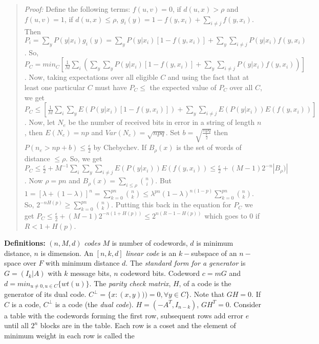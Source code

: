 \begin{quote}
\emph{Proof:}
Define the following terms: $f(u, v) = 0$, if $d(u,x) > \rho$ and
$f(u, v) = 1$, if $d(u,x) \leq \rho$,
$g_{i}(y)= 1- f(y, x_{i} ) + \sum_{i \ne j} f(y, x_{i})$. Then
$P_{i}= \sum_{y} P(y | x_{i}) g_{i}(y) =
\sum_{y} P(y|x_i ) [1- f(y, x_{i} )] + \sum_{y} \sum_{i \ne j}
P(y | x_i ) f(y, x_{i})$. So,
$P_{C}= min_{C} [{\frac {1} {M}}  \sum_{i} (\sum_{y}
\sum_{y} P(y|x_i ) [1- f(y, x_{i} )] + \sum_{y} \sum_{i \ne j}
P(y | x_i ) f(y, x_{i}))]$. Now,
taking expectations over all eligible $C$
and using the fact that at least one particular $C$ must have $P_C \leq$
the expected value of $P_C$  over all $C$, we get
$P_{C} \leq  [{\frac {1} {M}} \sum_{i}
\sum_{y} E(P(y|x_i ) [1- f(y, x_{i})]) + \sum_{y} \sum_{i \ne j}
E(P(y | x_i )) E(f(y, x_{i}))]$. Now,
let $N_e$ be the number of received bits in error in
a string of length $n$,
then $E(N_{e})= np$ and $Var(N_{e})= {\sqrt {npq}}$.  Set
$b= {\sqrt {\frac {npq} {\frac \epsilon 2}}}$ then
$P(n_e > np + b ) \leq {\frac \epsilon 2}$ by Chebychev. If $B_{\rho}(x)$
is the set of words of distance $\leq \rho$.  So, we get
$ P_C \leq {\frac {\epsilon} 2} + M^{-1} \sum_i \sum_y \sum_{i \ne j}
E(P(y | x_i )) E(f(y, x_i )) \leq {\frac {\epsilon} {2}} +
(M-1) 2^{-n} {|B_{\rho})|}$.
Now $\rho = pn$ and $B_{\rho}(x)= \sum_{i \leq \rho} { n \choose i}$.  But
$1= [\lambda +( 1- \lambda )]^{n}= \sum_{k=0}^{pn} {n \choose k} \leq
\lambda^{pn} (1-\lambda)^{n(1-p)} \sum_{k=0}^{pn} {n \choose k}$.  So,
$2^{-nH(p)} \geq \sum_{k=0}^{pn} {n \choose k}$.  Putting this back in the
equation for $P_C$
we get
$P_C \leq {\frac \epsilon 2} + (M-1) 2^{-n(1+H(p))} \leq
2^{n(R-1-H(p))}$ which goes to 0 if $R < 1+H(p)$.
\end{quote}
{\bf Definitions:} $(n,M,d)$ \emph{codes} $M$ is number of codewords, $d$ is minimum distance,
$n$ is dimension.
An $[n,k,d]$ \emph{linear code} is an $k-$subspace of an
$n-$ space over $F$ with minimum distance $d$.  The \emph{standard form for a generator} is
$G= (I_k | A)$ with
$k$ message bits, $n$ codeword bits.  Codeword $c=mG$ and
$d=min_{u \ne 0, u \in C} \{ wt(u) \}$.
The \emph{parity check matrix}, $H$, of
a code is the generator of its dual code. $C^{\perp} = \{x: (x,y)))= 0,
\forall y \in C \}$.  
Note that $GH=0$.
If $C$ is a code, $C^{\perp}$ is a code (the \emph{dual code}).  
$H=(-A^T, I_{n-k})$, $GH^T=0$.  Consider a table with the codewords forming the first
row, subsequent rows add error $e$ until all $2^n$ blocks are in the table.  
Each row is a coset and the element of minimum weight in each row is called the
